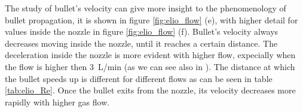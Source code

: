 The study of bullet's velocity can give more insight to the phenomenology of bullet propagation, it is shown in figure \ref{fig:elio_flow} (e), with higher detail for values inside the nozzle in figure \ref{fig:elio_flow} (f). Bullet's velocity always decreases moving inside the nozzle, until it reaches a certain distance. The deceleration inside the nozzle is more evident with higher flow, expecially when the flow is higher then \SI{3}{\liter/\minute} (as we can see also in \cite{Jarrige_2010}). The distance at which the bullet speeds up is different for different flows as can be seen in table \ref{tab:elio_Re}.
Once the bullet exits from the nozzle, its velocity decreases more rapidly with higher gas flow.
